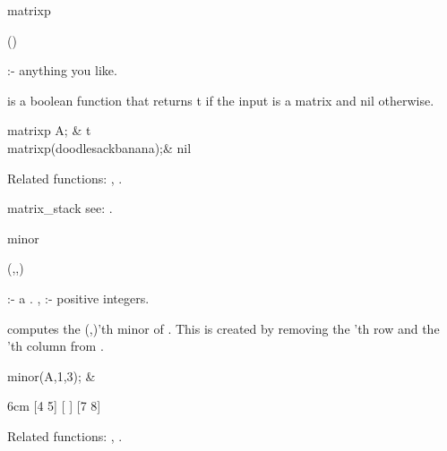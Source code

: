 \begin{Operator}{matrixp}

\begin{Syntax}
()
\end{Syntax}

 :- anything you like.

 is a boolean function that returns t if the input is a 
matrix and nil otherwise.


\begin{Examples}

matrixp A; &
t \\
matrixp(doodlesackbanana);&
nil 

\end{Examples}

Related functions: , .

\end{Operator}


\begin{Operator}{matrix_stack}
see:  .
\end{Operator}


\begin{Operator}{minor}

\begin{Syntax}
(,,)
\end{Syntax}

            :- a .
,        :- positive integers.

 computes the (,)'th minor of .
This is created by removing the 'th row and the 'th 
column from .

                
\begin{Examples}

minor(A,1,3); &
\begin{multilineoutput}{6cm}
[4  5]
[    ]
[7  8]
\end{multilineoutput}

\end{Examples}

Related functions:
, .

\end{Operator}


